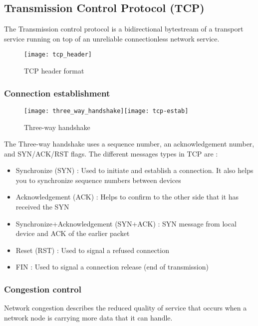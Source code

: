 \subsection[TCP]{Transmission Control Protocol (TCP)}

The Transmission control protocol is a bidirectional bytestream of a  transport service running on top of an unreliable connectionless network service.
\begin{figure}[H]
    \centering
    \texttt{[image: tcp\_header]}
    \caption{TCP header format}
\end{figure}

\subsubsection{Connection establishment}

\begin{figure}[H]
    \centering
    \texttt{[image: three\_way\_handshake]}\hfill	\texttt{[image: tcp-estab]}
	\caption{Three-way handshake}
\end{figure}

The Three-way handshake uses a sequence number, an acknowledgement number, and SYN/ACK/RST flags.
The different messages types in TCP are :
\begin{itemize}
\item Synchronize (SYN) : Used to initiate and establish a connection. It also helps you to synchronize sequence numbers between devices
\item Acknowledgement (ACK) : Helps to confirm to the other side that it has received the SYN
\item Synchronize+Acknowledgement (SYN+ACK) : SYN message from local device and ACK of the earlier packet
\item Reset (RST) : Used to signal a refused connection
\item FIN : Used to signal a connection release (end of transmission)
\end{itemize}

\subsubsection{Congestion control}

Network congestion describes the reduced quality of service that occurs when a network node is carrying more data that it can handle.

